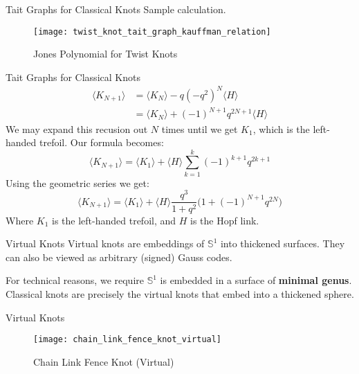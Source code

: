 \documentclass{beamer}
\begin{document}
    \begin{frame}{Tait Graphs for Classical Knots}
        Sample calculation.
        \begin{figure}
            \centering
            \texttt{[image: twist\_knot\_tait\_graph\_kauffman\_relation]}
            \caption{Jones Polynomial for Twist Knots}
        \end{figure}
    \end{frame}
    \begin{frame}{Tait Graphs for Classical Knots}
        \begin{align}
            \langle{K_{N+1}}\rangle
            &=\langle{K_{N}}\rangle
            -q(-q^{2})^{N}\langle{H}\rangle\\
            &=\langle{K_{N}}\rangle
            +(-1)^{N+1}q^{2N+1}\langle{H}\rangle
        \end{align}
        We may expand this recusion out $N$ times until we get $K_{1}$,
        which is the left-handed trefoil. Our formula becomes:
        \begin{equation}
            \langle{K_{N+1}}\rangle
            =\langle{K_{1}}\rangle
            +\langle{H}\rangle
            \sum_{k=1}^{k}(-1)^{k+1}q^{2k+1}
        \end{equation}
        Using the geometric series we get:
        \begin{equation}
            \langle{K_{N+1}}\rangle
            =\langle{K_{1}}\rangle+\langle{H}\rangle
            \frac{q^{3}}{1+q^{2}}\big(1+(-1)^{N+1}q^{2N}\big)
        \end{equation}
        Where $K_{1}$ is the left-handed trefoil, and $H$ is the Hopf link.
    \end{frame}
    \begin{frame}{Virtual Knots}
        Virtual knots are embeddings of $\mathbb{S}^{1}$ into thickened
        surfaces. They can also be viewed as arbitrary (signed) Gauss codes.
        \par\hfill\par
        For technical reasons, we require $\mathbb{S}^{1}$ is embedded in
        a surface of \textbf{minimal genus}. Classical knots are precisely
        the virtual knots that embed into a thickened sphere.
    \end{frame}
    \begin{frame}{Virtual Knots}
        \begin{figure}
            \centering
            \texttt{[image: chain\_link\_fence\_knot\_virtual]}
            \caption{Chain Link Fence Knot (Virtual)}
        \end{figure}
    \end{frame}
\end{document}
